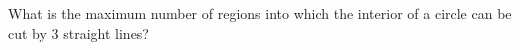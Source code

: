 What is the maximum number of regions into which the interior of a circle can be cut by $3$ straight lines?
